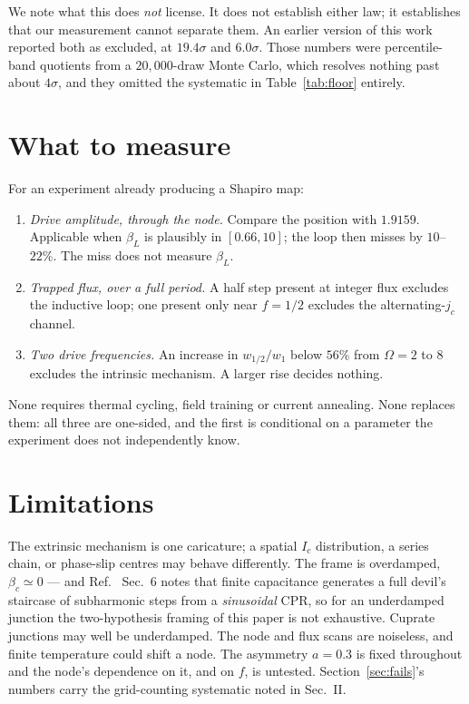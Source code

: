 \documentclass[aps,prb,twocolumn,superscriptaddress,floatfix,nofootinbib]{revtex4-2}
\begin{document}
We note what this does \emph{not} license. It does not establish either law; it
establishes that our measurement cannot separate them. An earlier version of
this work reported both as excluded, at $19.4\sigma$ and $6.0\sigma$. Those
numbers were percentile-band quotients from a $20{,}000$-draw Monte Carlo, which
resolves nothing past about $4\sigma$, and they omitted the systematic in
Table~\ref{tab:floor} entirely.

\section{What to measure}

For an experiment already producing a Shapiro map:
\begin{enumerate}
  \item \emph{Drive amplitude, through the node.} Compare the position with
        $1.9159$. Applicable when $\beta_L$ is plausibly in $[0.66,10]$; the
        loop then misses by $10$--$22\%$. The miss does not measure $\beta_L$.
  \item \emph{Trapped flux, over a full period.} A half step present at integer
        flux excludes the inductive loop; one present only near $f=1/2$ excludes
        the alternating-$j_c$ channel.
  \item \emph{Two drive frequencies.} An increase in $w_{1/2}/w_1$ below $56\%$
        from $\Omega=2$ to $8$ excludes the intrinsic mechanism. A larger rise
        decides nothing.
\end{enumerate}
None requires thermal cycling, field training or current annealing. None
replaces them: all three are one-sided, and the first is conditional on a
parameter the experiment does not independently know.

\section{Limitations}

The extrinsic mechanism is one caricature; a spatial $I_c$ distribution, a
series chain, or phase-slip centres may behave differently. The frame is
overdamped, $\beta_c\simeq0$ --- and Ref.~\cite{Tsarev2025} Sec.~6 notes that
finite capacitance generates a full devil's staircase of subharmonic steps from
a \emph{sinusoidal} CPR, so for an underdamped junction the two-hypothesis
framing of this paper is not exhaustive. Cuprate junctions may well be
underdamped. The node and flux scans are noiseless, and finite temperature could
shift a node. The asymmetry $a=0.3$ is fixed throughout and the node's
dependence on it, and on $f$, is untested. Section~\ref{sec:fails}'s numbers
carry the grid-counting systematic noted in Sec.~II.
\end{document}
